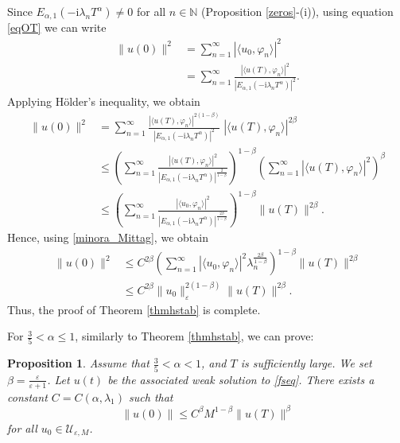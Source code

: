 \documentclass[reqno]{amsart}
\makeatletter
\renewenvironment{proof}[1][\proofname]{\par
  \pushQED{\qed}%
  \normalfont \topsep6\p@\@plus6\p@\relax
  \trivlist
  \item[\hskip\labelsep\bfseries #1\@addpunct{.}]%
}{%
  \popQED\endtrivlist\@endpefalse
}
\newtheorem{prop}[theorem]{Proposition}
\numberwithin{equation}{section}
\makeatother
\begin{document}
\begin{proof}[Proof of Theorem \ref{thmhstab}]
Since $E_{\alpha, 1}\left(-\mathrm{i}\lambda_{n} T^{\alpha}\right)\neq 0$ for all $n\in\mathbb{N}$ (Proposition \ref{zeros}-(i)), using equation \eqref{eqOT} we can write
\begin{align*}
    \|u(0)\|^{2}&= \sum_{n=1}^{\infty}|\langle u_0, \varphi_{n}\rangle|^{2} \\
    & = \sum_{n=1}^{\infty} \frac{|\langle u(T), \varphi_{n}\rangle|^{2}}{\left|E_{\alpha, 1}\left(-\mathrm{i}\lambda_{n} T^{\alpha}\right)\right|^2}.
\end{align*}
Applying Hölder's inequality, we obtain
\begin{align*}
    \|u(0)\|^{2}
    & = \sum_{n=1}^{\infty} \frac{|\langle u(T), \varphi_{n}\rangle|^{2(1-\beta)}}{\left|E_{\alpha, 1}\left(-\mathrm{i}\lambda_{n} T^{\alpha}\right)\right|^{2}} \; |\langle u(T), \varphi_{n}\rangle|^{2\beta}\\
    & \le \left(\sum_{n=1}^{\infty} \frac{|\langle u(T), \varphi_{n}\rangle|^{2}}{\left|E_{\alpha, 1}\left(-\mathrm{i}\lambda_{n} T^{\alpha}\right)\right|^{\frac{2}{1-\beta}}}\right)^{1-\beta} \left(\sum_{n=1}^{\infty} |\langle u(T), \varphi_{n}\rangle|^{2}\right)^\beta\\
    & \le \left(\sum_{n=1}^{\infty} \frac{|\langle u_0, \varphi_{n}\rangle|^{2}}{\left|E_{\alpha, 1}\left(-\mathrm{i}\lambda_{n} T^{\alpha}\right)\right|^{\frac{2\beta}{1-\beta}}}\right)^{1-\beta} \|u(T)\|^{2\beta}.
\end{align*}
Hence, using \eqref{minora_Mittag}, we obtain
\begin{align*}
    \|u(0)\|^{2}& \le C^{2\beta} \left(\sum_{n=1}^{\infty} |\langle u_0, \varphi_{n}\rangle|^{2} \lambda_n^{\frac{2\beta}{1-\beta}}\right)^{1-\beta} \|u(T)\|^{2\beta}\\
    & \le C^{2\beta} \|u_0\|_{\varepsilon}^{2(1-\beta)} \|u(T)\|^{2\beta}.
\end{align*}
Thus, the proof of Theorem \ref{thmhstab} is complete.
\end{proof}

For $\frac{3}{5} < \alpha \le 1$, similarly to Theorem \ref{thmhstab}, we can prove:
\begin{prop}
Assume that $\frac{3}{5}<\alpha <1$, and $T$ is sufficiently large. We set $\beta =\frac{\varepsilon}{\varepsilon + 1}$. Let $u(t)$ be the associated weak solution to \eqref{fseq}. There exists a constant $C=C(\alpha,\lambda_{1})$ such that
\begin{equation}\label{eqthmhstabT}
    \|u(0)\| \le C^{\beta} M^{1-\beta} \|u(T)\|^{\beta}
\end{equation}
for all $u_0\in \mathcal{U}_{\varepsilon,M}$.
\end{prop}
\end{document}
